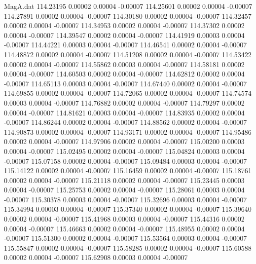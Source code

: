 \begin{filecontents}{MagA.dat}
 114.23195    0.00002    0.00004   -0.00007
 114.25601    0.00002    0.00004   -0.00007
 114.27891    0.00002    0.00004   -0.00007
 114.30180    0.00002    0.00004   -0.00007
 114.32457    0.00002    0.00004   -0.00007
 114.34953    0.00002    0.00004   -0.00007
 114.37302    0.00002    0.00004   -0.00007
 114.39547    0.00002    0.00004   -0.00007
 114.41919    0.00003    0.00004   -0.00007
 114.44221    0.00003    0.00004   -0.00007
 114.46541    0.00002    0.00004   -0.00007
 114.48872    0.00002    0.00004   -0.00007
 114.51208    0.00002    0.00004   -0.00007
 114.53422    0.00002    0.00004   -0.00007
 114.55862    0.00003    0.00004   -0.00007
 114.58181    0.00002    0.00004   -0.00007
 114.60503    0.00002    0.00004   -0.00007
 114.62812    0.00002    0.00004   -0.00007
 114.65113    0.00003    0.00004   -0.00007
 114.67440    0.00002    0.00004   -0.00007
 114.69855    0.00002    0.00004   -0.00007
 114.72065    0.00002    0.00004   -0.00007
 114.74574    0.00003    0.00004   -0.00007
 114.76882    0.00002    0.00004   -0.00007
 114.79297    0.00002    0.00004   -0.00007
 114.81621    0.00003    0.00004   -0.00007
 114.83935    0.00002    0.00004   -0.00007
 114.86244    0.00002    0.00004   -0.00007
 114.88562    0.00002    0.00004   -0.00007
 114.90873    0.00002    0.00004   -0.00007
 114.93171    0.00002    0.00004   -0.00007
 114.95486    0.00002    0.00004   -0.00007
 114.97906    0.00002    0.00004   -0.00007
 115.00200    0.00003    0.00004   -0.00007
 115.02495    0.00002    0.00004   -0.00007
 115.04824    0.00003    0.00004   -0.00007
 115.07158    0.00002    0.00004   -0.00007
 115.09484    0.00003    0.00004   -0.00007
 115.14122    0.00002    0.00004   -0.00007
 115.16459    0.00002    0.00004   -0.00007
 115.18761    0.00002    0.00004   -0.00007
 115.21118    0.00002    0.00004   -0.00007
 115.23445    0.00003    0.00004   -0.00007
 115.25753    0.00002    0.00004   -0.00007
 115.28061    0.00003    0.00004   -0.00007
 115.30378    0.00003    0.00004   -0.00007
 115.32696    0.00003    0.00004   -0.00007
 115.34994    0.00003    0.00004   -0.00007
 115.37340    0.00002    0.00004   -0.00007
 115.39640    0.00002    0.00004   -0.00007
 115.41968    0.00003    0.00004   -0.00007
 115.44316    0.00002    0.00004   -0.00007
 115.46663    0.00002    0.00004   -0.00007
 115.48955    0.00002    0.00004   -0.00007
 115.51300    0.00002    0.00004   -0.00007
 115.53564    0.00003    0.00004   -0.00007
 115.55847    0.00002    0.00004   -0.00007
 115.58285    0.00002    0.00004   -0.00007
 115.60588    0.00002    0.00004   -0.00007
 115.62908    0.00003    0.00004   -0.00007

\end{filecontents}
